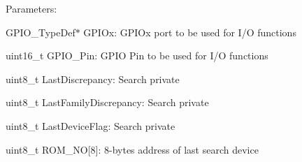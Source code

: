 Parameters\+:
\begin{DoxyItemize}
\item G\+P\+I\+O\+\_\+\+Type\+Def$\ast$ G\+P\+I\+Ox\+: G\+P\+I\+Ox port to be used for I/\+O functions
\item uint16\+\_\+t G\+P\+I\+O\+\_\+\+Pin\+: G\+P\+I\+O Pin to be used for I/\+O functions
\item uint8\+\_\+t Last\+Discrepancy\+: Search private
\item uint8\+\_\+t Last\+Family\+Discrepancy\+: Search private
\item uint8\+\_\+t Last\+Device\+Flag\+: Search private
\item uint8\+\_\+t R\+O\+M\+\_\+\+N\+O\mbox{[}8\mbox{]}\+: 8-\/bytes address of last search device 
\end{DoxyItemize}